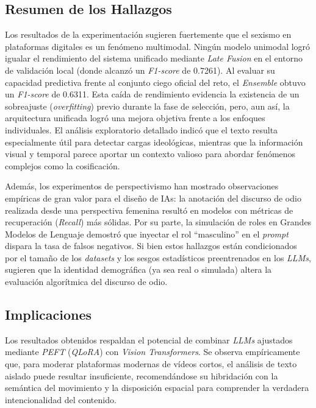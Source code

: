 \subsection*{Resumen de los Hallazgos}
Los resultados de la experimentación sugieren fuertemente que el sexismo en plataformas digitales es un fenómeno multimodal. Ningún modelo unimodal logró igualar el rendimiento del sistema unificado mediante \textit{Late Fusion} en el entorno de validación local (donde alcanzó un \textit{F1-score} de 0.7261). Al evaluar su capacidad predictiva frente al conjunto ciego oficial del reto, el \textit{Ensemble} obtuvo un \textit{F1-score} de 0.6311. Esta caída de rendimiento evidencia la existencia de un sobreajuste (\textit{overfitting}) previo durante la fase de selección, pero, aun así, la arquitectura unificada logró una mejora objetiva frente a los enfoques individuales. El análisis exploratorio detallado indicó que el texto resulta especialmente útil para detectar cargas ideológicas, mientras que la información visual y temporal parece aportar un contexto valioso para abordar fenómenos complejos como la cosificación.

Además, los experimentos de perspectivismo han mostrado observaciones empíricas de gran valor para el diseño de IAs: la anotación del discurso de odio realizada desde una perspectiva femenina resultó en modelos con métricas de recuperación (\textit{Recall}) más sólidas. Por su parte, la simulación de roles en Grandes Modelos de Lenguaje demostró que inyectar el rol ``masculino'' en el \textit{prompt} dispara la tasa de falsos negativos. Si bien estos hallazgos están condicionados por el tamaño de los \textit{datasets} y los sesgos estadísticos preentrenados en los \textit{LLMs}, sugieren que la identidad demográfica (ya sea real o simulada) altera la evaluación algorítmica del discurso de odio.

\subsection*{Implicaciones}
Los resultados obtenidos respaldan el potencial de combinar \textit{LLMs} ajustados mediante \textit{PEFT} (\textit{QLoRA}) con \textit{Vision Transformers}. Se observa empíricamente que, para moderar plataformas modernas de vídeos cortos, el análisis de texto aislado puede resultar insuficiente, recomendándose su hibridación con la semántica del movimiento y la disposición espacial para comprender la verdadera intencionalidad del contenido.

